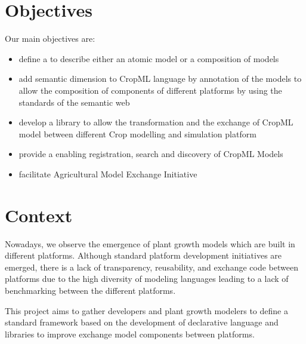 \documentclass[letterpaper,13pt,english]{sphinxmanual}
\begin{document}
\section{Objectives}
\label{\detokenize{user/overview:objectives}}
Our main objectives are:
\begin{itemize}
\item {} 
define a  to describe either an atomic model or a composition of models

\item {} 
add semantic dimension to CropML language by annotation of the models to allow the composition of components of different platforms by using the standards of the semantic web

\item {} 
develop a library to allow the transformation and the exchange of CropML model between different Crop modelling and simulation platform

\item {} 
provide a  enabling registration, search and discovery of CropML Models

\item {} 
facilitate Agricultural Model Exchange Initiative

\end{itemize}


\section{Context}
\label{\detokenize{user/overview:context}}
\begin{DUlineblock}{0em}
\item[] Nowadays, we observe the emergence of plant growth models which are built
in different  platforms. Although standard platform development initiatives
are emerged, there is a lack of  transparency, reusability, and exchange
code between platforms due to the high diversity of modeling languages
leading to a lack of benchmarking between the different platforms.
\item[] This project aims to gather developers and plant growth modelers
to define a standard framework based on the development of declarative language and libraries to improve exchange model components between platforms.
\end{DUlineblock}
\end{document}
